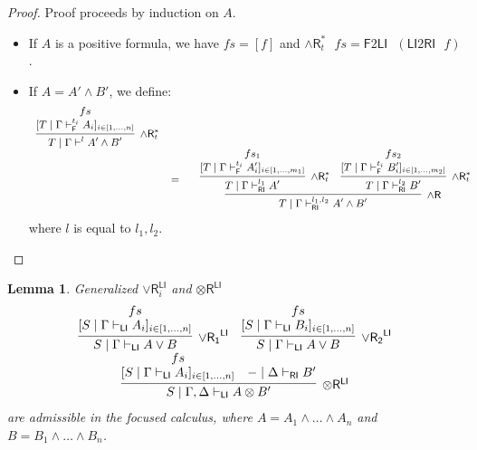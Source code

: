 \documentclass[submission,copyright,creativecommons]{eptcs}
\newtheorem{lemma}[theorem]{Lemma}
\theoremstyle{definition}
\newcommand{\tr}{\otimes \mathsf{R}}
\newcommand{\andr}{\land \mathsf{R}}
\newcommand{\orrone}{\lor \mathsf{R_{1}}}
\newcommand{\orrtwo}{\lor \mathsf{R_{2}}}
\newcommand{\orri}{\lor \mathsf{R}_{i}}
\newcommand{\ot}{\otimes}
\newcommand{\RI}{\mathsf{RI}}
\newcommand{\LI}{\mathsf{LI}}
\newcommand{\F}{\mathsf{F}}
\newcommand{\proofbox}[1]{\begin{tabular}{l} #1 \end{tabular}}
\begin{document}
\begin{proof}
  Proof proceeds by induction on $A$.
  \begin{itemize}
    \item If $A$ is a positive formula, we have $fs = [ f ]$ and $\andr^*_{t} \text{ } fs = \F 2 \LI \text{ } (\LI 2 \RI \text{ } f)$.
    \item If $A = A' \land B'$, we define:
    \begin{displaymath}
      \small
      \begin{array}{cc}
        \infer[\andr^*_{t}]{T \mid \Gamma \vdash^{l} A' \land B'}{
          \deduce{[T \mid \Gamma \vdash^{t_i}_{\F} A_i]_{i \in [1 , \dots , n]}}{fs}
        }
        \\
        &
        =
        \quad
        \proofbox{
        \infer[\andr]{T \mid \Gamma \vdash^{l_1 , l_2}_{\RI} A' \land B'}{
          \infer[\andr^{*}_{t}]{T \mid \Gamma \vdash^{l_1}_{\RI} A'}{
            \deduce{[T \mid \Gamma \vdash^{t_i}_{\F} A'_i]_{i \in [1 , \dots , m_1]}}{fs_1}
          }
          &
          \infer[\andr^{*}_{t}]{T \mid \Gamma \vdash^{l_2}_{\RI} B'}{
            \deduce{[T \mid \Gamma \vdash^{t_i}_{\F} B'_i]_{i \in [1 , \dots , m_2]}}{fs_2}
          }
        }
       }
      \end{array}
    \end{displaymath}
    where $l$ is equal to $l_1 , l_2$.
  \end{itemize}
\end{proof}
\begin{lemma}
  Generalized $\orri^{\LI}$ and $\tr^{\LI}$
  \begin{displaymath}
    \begin{array}{c}
      \infer[\orrone^{\LI}]{S \mid \Gamma \vdash_{\LI} A \lor B}{
        \deduce{[S \mid \Gamma \vdash_{\LI} A_i]_{i \in [1 , \dots , n]}}{fs}
      }
      \quad
      \infer[\orrtwo^{\LI}]{S \mid \Gamma \vdash_{\LI} A \lor B}{
        \deduce{[S \mid \Gamma \vdash_{\LI} B_i]_{i \in [1 , \dots , n]}}{fs}
      }
      \\
      \infer[\tr^{\LI}]{S \mid \Gamma , \Delta \vdash_{\LI} A \ot B'}{
        \deduce{[S \mid \Gamma \vdash_{\LI} A_i]_{i \in [1 , \dots , n]}}{fs}
        &
        - \mid \Delta \vdash_{\RI} B'
      }
    \end{array}
  \end{displaymath}
  are admissible in the focused calculus, where $A = A_1 \land \dots \land A_n$ and $B = B_1 \land \dots \land B_n$.
\end{lemma}
\end{document}
